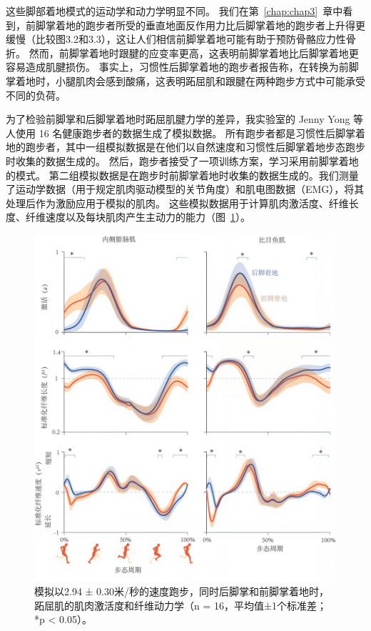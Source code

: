 这些脚部着地模式的运动学和动力学明显不同。
我们在第~\ref{chap:chap3}~章中看到，前脚掌着地的跑步者所受的垂直地面反作用力比后脚掌着地的跑步者上升得更缓慢（比较图3.2和3.3），这让人们相信前脚掌着地可能有助于预防骨骼应力性骨折。
然而，前脚掌着地时跟腱的应变率更高\cite{lyght2016effects}，这表明前脚掌着地比后脚掌着地更容易造成肌腱损伤。
事实上，习惯性后脚掌着地的跑步者报告称，在转换为前脚掌着地时，小腿肌肉会感到酸痛，这表明跖屈肌和跟腱在两种跑步方式中可能承受不同的负荷。


为了检验前脚掌和后脚掌着地时跖屈肌腱力学的差异，我实验室的 Jenny Yong 等人使用 16 名健康跑步者的数据生成了模拟数据。
所有跑步者都是习惯性后脚掌着地的跑步者，其中一组模拟数据是在他们以自然速度和习惯性后脚掌着地步态跑步时收集的数据生成的。
然后，跑步者接受了一项训练方案，学习采用前脚掌着地的模式。
第二组模拟数据是在跑步时前脚掌着地时收集的数据生成的。我们测量了运动学数据（用于规定肌肉驱动模型的关节角度）和肌电图数据（EMG），将其处理后作为激励应用于模拟的肌肉。
这些模拟数据用于计算肌肉激活度、纤维长度、纤维速度以及每块肌肉产生主动力的能力（图~\ref{fig:12_10}）。

\begin{figure}[!htb]
	\centering
	\includegraphics[width=1.0\linewidth]{chap12/12_10}
	\caption{模拟以2.94 ± 0.30米/秒的速度跑步，同时后脚掌和前脚掌着地时，跖屈肌的肌肉激活度和纤维动力学（n = 16，平均值±1个标准差；*p < 0.05）\cite{yong2020foot}。 \label{fig:12_10}}
\end{figure}


